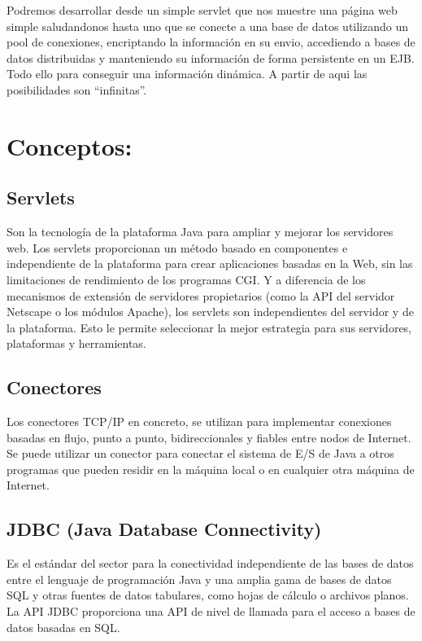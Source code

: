 \documentclass[titlepage, 12pt]{article}
\begin{document}
Podremos desarrollar desde un simple servlet que nos muestre una página web simple saludandonos hasta uno que se conecte a una base de datos utilizando un pool de conexiones, encriptando la información en su envio, accediendo a bases de datos distribuidas y manteniendo su información de forma persistente en un EJB. Todo ello para conseguir una información dinámica. A partir de aqui las posibilidades son “infinitas”.

\pagebreak

\section{Conceptos:}

\subsection{Servlets}
Son la tecnología de la plataforma Java para ampliar y mejorar los servidores web. Los servlets proporcionan un método basado en componentes e independiente de la plataforma para crear aplicaciones basadas en la Web, sin las limitaciones de rendimiento de los programas CGI. Y a diferencia de los mecanismos de extensión de servidores propietarios (como la API del servidor Netscape o los módulos Apache), los servlets son independientes del servidor y de la plataforma. Esto le permite seleccionar la mejor estrategia para sus servidores, plataformas y herramientas.\par\vspace{0.5cm}

\subsection{Conectores}
 Los conectores TCP/IP en concreto, se utilizan para implementar conexiones basadas en flujo, punto a punto, bidireccionales y fiables entre nodos de Internet. Se puede utilizar un conector para conectar el sistema de E/S de Java a otros programas que pueden residir en la máquina local o en cualquier otra máquina de Internet. \par\vspace{0.5cm}
 
\subsection{JDBC (Java Database Connectivity)}
Es el estándar del sector para la conectividad independiente de las bases de datos entre el lenguaje de programación Java y una amplia gama de bases de datos SQL y otras fuentes de datos tabulares, como hojas de cálculo o archivos planos. La API JDBC proporciona una API de nivel de llamada para el acceso a bases de datos basadas en SQL.
\end{document}
